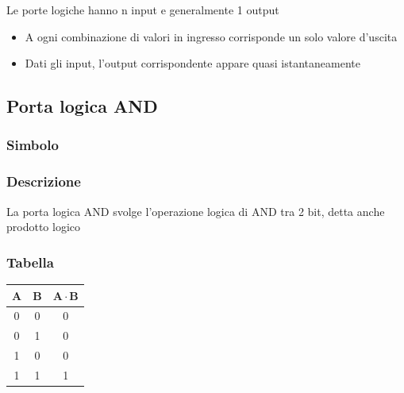 Le porte logiche hanno n input e generalmente 1 output
\begin{itemize}
    \item A ogni combinazione di valori in ingresso corrisponde un solo valore d'uscita
    \item Dati gli input, l'output corrispondente appare quasi istantaneamente
\end{itemize}

\subsection{Porta logica AND}

\begin{minipage}[t]{0.31\textwidth}
    \subsubsection{Simbolo}
\end{minipage}
\hfill
\begin{minipage}[t]{0.31\textwidth}
    \subsubsection{Descrizione}
    La porta logica AND svolge l'operazione logica di AND tra 2 bit, detta anche prodotto logico
\end{minipage}
\hfill
\begin{minipage}[t]{0.31\textwidth}
        \subsubsection{Tabella}
        \begin{tabular}{|c|c|c|}
            \hline
            $\mathbf{A}$ & $\mathbf{B}$ & $\mathbf{A \cdot B}$ \\ \hline
            0   &   0   &   0 \\ \hline
            0   &   1   &   0 \\ \hline
            1   &   0   &   0 \\ \hline
            1   &   1   &   1 \\ \hline
        \end{tabular}
\end{minipage}


